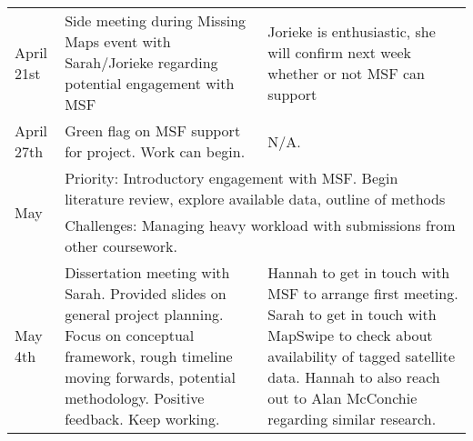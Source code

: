 \begin{singlespace}
\begin{longtable}{|p{2cm}|p{5cm}|p{5cm}}
April 21st              & Side meeting during Missing Maps event with Sarah/Jorieke regarding potential engagement with MSF                                                                                                                                                     & Jorieke is enthusiastic, she will confirm next week whether or not MSF can support                                                                                                                                          \\
April 27th              & Green flag on MSF support for project. Work can begin.                                                                                                                                                                                                & N/A.                                                                                                                                                                                                                        \\ 
\hline
\multirow{2}{*}{May}    & \multicolumn{2}{p{8cm}}{Priority: Introductory engagement with MSF. Begin literature review, explore available data, outline of methods}                                                                                                                                                                                                                                                                                                                                                 \\
                        & \multicolumn{2}{p{8cm}}{Challenges: Managing heavy workload with submissions from other coursework.}                                                                                                                                                                                                                                                                                                                                                                                     \\ 
\hline
May 4th                 & Dissertation meeting with Sarah. Provided slides on general project planning. Focus on conceptual framework, rough timeline moving forwards, potential methodology. Positive feedback. Keep working.                                                  & Hannah to get in touch with MSF to arrange first meeting. Sarah to get in touch with MapSwipe to check about availability of tagged satellite data. Hannah to also reach out to Alan McConchie regarding similar research.  \\

\end{longtable}
\end{singlespace}

